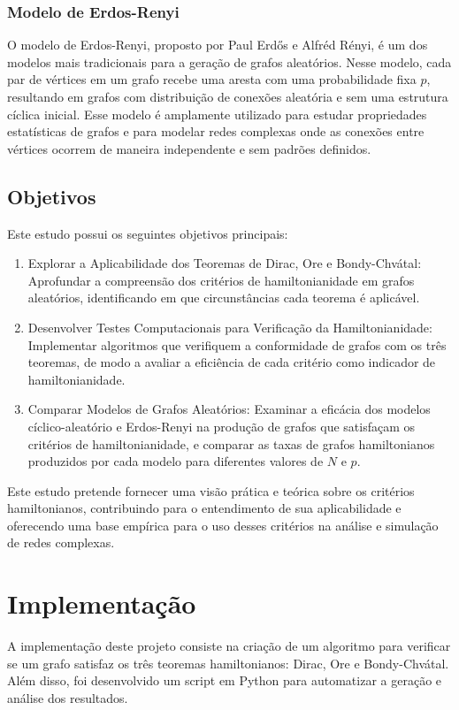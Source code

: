 \documentclass[12pt, openright, oneside, a4paper, chapter=TITLE, section=TITLE, subsection=TITLE, subsubsection=TITLE, brazil]{abntex2}
\begin{document}
\subsection{Modelo de Erdos-Renyi}
O modelo de Erdos-Renyi, proposto por Paul Erdős e Alfréd Rényi, é um dos modelos mais tradicionais para a geração de grafos aleatórios. Nesse modelo, cada par de vértices em um grafo recebe uma aresta com uma probabilidade fixa $p$, resultando em grafos com distribuição de conexões aleatória e sem uma estrutura cíclica inicial. Esse modelo é amplamente utilizado para estudar propriedades estatísticas de grafos e para modelar redes complexas onde as conexões entre vértices ocorrem de maneira independente e sem padrões definidos.

\section{Objetivos}
Este estudo possui os seguintes objetivos principais:
\begin{enumerate}
    \item Explorar a Aplicabilidade dos Teoremas de Dirac, Ore e Bondy-Chvátal: Aprofundar a compreensão dos critérios de hamiltonianidade em grafos aleatórios, identificando em que circunstâncias cada teorema é aplicável.
    \item Desenvolver Testes Computacionais para Verificação da Hamiltonianidade: Implementar algoritmos que verifiquem a conformidade de grafos com os três teoremas, de modo a avaliar a eficiência de cada critério como indicador de hamiltonianidade.
    \item Comparar Modelos de Grafos Aleatórios: Examinar a eficácia dos modelos cíclico-aleatório e Erdos-Renyi na produção de grafos que satisfaçam os critérios de hamiltonianidade, e comparar as taxas de grafos hamiltonianos produzidos por cada modelo para diferentes valores de $N$ e $p$.
\end{enumerate}
Este estudo pretende fornecer uma visão prática e teórica sobre os critérios hamiltonianos, contribuindo para o entendimento de sua aplicabilidade e oferecendo uma base empírica para o uso desses critérios na análise e simulação de redes complexas.

\chapter{Implementação}
A implementação deste projeto consiste na criação de um algoritmo para verificar se um grafo satisfaz os três teoremas hamiltonianos: Dirac, Ore e Bondy-Chvátal. Além disso, foi desenvolvido um script em Python para automatizar a geração e análise dos resultados.
\end{document}
